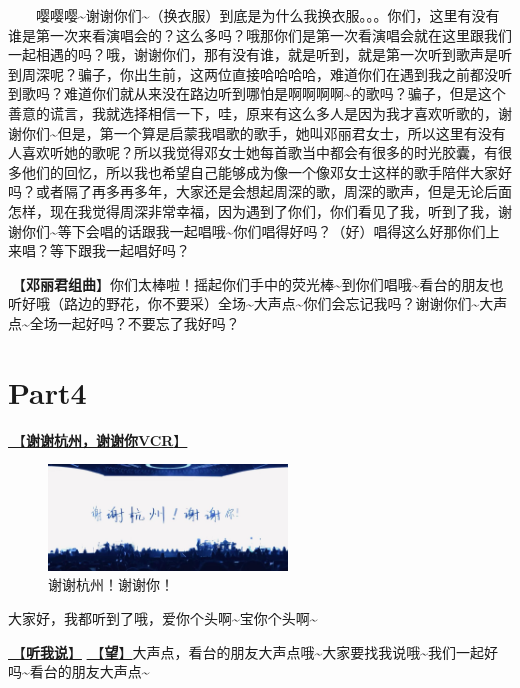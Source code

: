 \documentclass[]{ctexbook}
\begin{document}
  嘤嘤嘤\textasciitilde 谢谢你们\textasciitilde（换衣服）到底是为什么我换衣服。。。你们，这里有没有谁是第一次来看演唱会的？这么多吗？哦那你们是第一次看演唱会就在这里跟我们一起相遇的吗？哦，谢谢你们，那有没有谁，就是听到，就是第一次听到歌声是听到周深呢？骗子，你出生前，这两位直接哈哈哈哈，难道你们在遇到我之前都没听到歌吗？难道你们就从来没在路边听到哪怕是啊啊啊啊\textasciitilde 的歌吗？骗子，但是这个善意的谎言，我就选择相信一下，哇，原来有这么多人是因为我才喜欢听歌的，谢谢你们\textasciitilde 但是，第一个算是启蒙我唱歌的歌手，她叫邓丽君女士，所以这里有没有人喜欢听她的歌呢？所以我觉得邓女士她每首歌当中都会有很多的时光胶囊，有很多他们的回忆，所以我也希望自己能够成为像一个像邓女士这样的歌手陪伴大家好吗？或者隔了再多再多年，大家还是会想起周深的歌，周深的歌声，但是无论后面怎样，现在我觉得周深非常幸福，因为遇到了你们，你们看见了我，听到了我，谢谢你们\textasciitilde 等下会唱的话跟我一起唱哦\textasciitilde 你们唱得好吗？（好）唱得这么好那你们上来唱？等下跟我一起唱好吗？

🎵【\textbf{邓丽君组曲}】你们太棒啦！摇起你们手中的荧光棒\textasciitilde 到你们唱哦\textasciitilde 看台的朋友也听好哦（路边的野花，你不要采）全场\textasciitilde 大声点\textasciitilde 你们会忘记我吗？谢谢你们\textasciitilde 大声点\textasciitilde 全场一起好吗？不要忘了我好吗？

\section{Part4}\label{hangzhou-20240823-part4}

\hyperref[thank-you-vcr]{🎥【\textbf{谢谢杭州，谢谢你VCR}】}

\begin{figure}

{\centering \includegraphics[width=180pt]{img/hangzhou20240823/thank-hangzhou} 

}

\caption{谢谢杭州！谢谢你！}\label{fig:unnamed-chunk-69}
\end{figure}

大家好，我都听到了哦，爱你个头啊\textasciitilde 宝你个头啊\textasciitilde{}

\hyperref[listen-to-me]{🎵【\textbf{听我说}】} \hyperref[hope]{🎵【\textbf{望}】}大声点，看台的朋友大声点哦\textasciitilde 大家要找我说哦\textasciitilde 我们一起好吗\textasciitilde 看台的朋友大声点\textasciitilde{}
\end{document}
